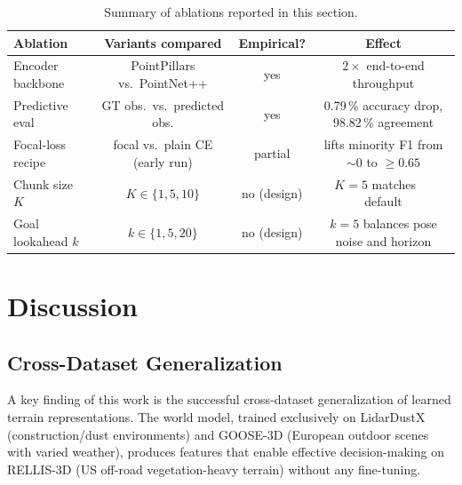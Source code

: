 \documentclass[sensors,article,submit,pdftex,moreauthors]{Definitions/mdpi}
\providecommand{\DIFadd}[1]{{\protect\color{red}#1}} %
\providecommand{\DIFaddend}{} %
\providecommand{\DIFaddFL}[1]{\DIFadd{#1}} %
\DeclareRobustCommand{\DIFaddend}{\DIFOaddend \let\includegraphics\DIFOincludegraphics} %
\begin{document}
\begin{table}[H]
\caption{\DIFaddFL{Summary of ablations reported in this section.}}
\label{tab:ablation_summary}
\centering
\footnotesize
\begin{tabular}{lccc}
\toprule
\DIFaddFL{Ablation }& \DIFaddFL{Variants compared }& \DIFaddFL{Empirical? }& \DIFaddFL{Effect }\\
\midrule
\DIFaddFL{Encoder backbone   }& \DIFaddFL{PointPillars vs.\ PointNet++ }& \DIFaddFL{yes }& \DIFaddFL{$2{\times}$ end-to-end throughput }\\
\DIFaddFL{Predictive eval    }& \DIFaddFL{GT obs.\ vs.\ predicted obs. }& \DIFaddFL{yes }& \DIFaddFL{0.79\,\% accuracy drop, 98.82\,\% agreement }\\
\DIFaddFL{Focal-loss recipe  }& \DIFaddFL{focal vs.\ plain CE (early run) }& \DIFaddFL{partial }& \DIFaddFL{lifts minority F1 from $\sim$0 to $\geq 0.65$ }\\
\DIFaddFL{Chunk size $K$     }& \DIFaddFL{$K{\in}\{1,5,10\}$           }& \DIFaddFL{no (design)  }& \DIFaddFL{$K{=}5$ matches \mbox{%
\cite{zhao2023act} }\hskip0pt%
default }\\
\DIFaddFL{Goal lookahead $k$ }& \DIFaddFL{$k{\in}\{1,5,20\}$           }& \DIFaddFL{no (design)  }& \DIFaddFL{$k{=}5$ balances pose noise and horizon }\\
\bottomrule
\end{tabular}
\end{table}

\DIFaddend \section{Discussion}
\label{sec:discussion}

\subsection{Cross-Dataset Generalization}

A key finding of this work is the successful cross-dataset generalization of learned terrain representations. The world model, trained exclusively on LidarDustX (construction/dust environments) and GOOSE-3D (European outdoor scenes with varied weather), produces features that enable effective decision-making on RELLIS-3D (US off-road vegetation-heavy terrain) without any fine-tuning.
\end{document}
